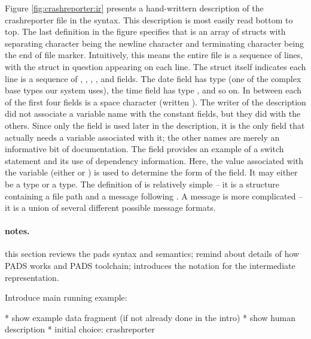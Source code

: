 Figure \ref{fig:crashreporter:ir} presents a hand-writtern description
of the crashreporter file in the \ir{} syntax.  This
description is most easily read bottom to top.  The
last definition in the figure specifies that  is an
array of structs with separating character being the newline character
and terminating character being the end of file marker.  Intuitively,
this means the entire file is a sequence of lines, with the struct
in question appearing on each line.  The struct itself indicates each line
is a sequence of , , , ,  and 
 fields.  The date field has type  (one of the
complex base types our system uses), the time field has type ,
and so on.  In between each of the first four fields is a space character
(written ).  The writer of the description did not
associate a variable name with the constant fields, but they did with the
others.  Since only the  field is used later in the description,
it is the only field that actually needs a variable associated with it;
the other names are merely an informative bit of documentation.  The
 field provides an example of a switch statement and its
use of dependency information.  Here, the value associated with the
 variable (either  or )
is used to determine the form of the  field.  It may either be
a  type or a  type.  
The definition of  is relatively simple -- it is
a structure containing a file path and a message following 
.  A  message is more complicated --
it is a union of several different possible message formats.



\paragraph {notes.}
this section reviews the pads syntax and semantics; 
remind about details of how PADS works and PADS toolchain;
introduces the
notation for the intermediate representation.


Introduce main running example:  

    * show example data fragment (if not already done in the intro)
    * show human description
    * initial choice: crashreporter




